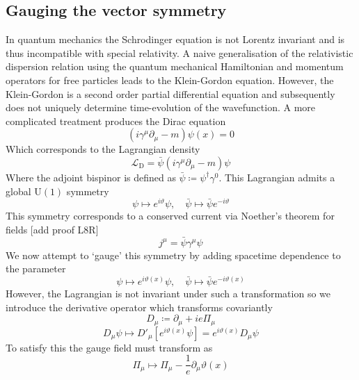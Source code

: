 \documentclass[11pt, a4paper]{article}
\theoremstyle{definition}
\theoremstyle{plain}
\begin{document}
\subsection{Gauging the vector symmetry}

In quantum mechanics the Schrodinger equation is not Lorentz invariant and is thus
incompatible with special relativity. A naive generalisation of the relativistic
dispersion relation using the quantum mechanical
Hamiltonian and momentum operators for free particles leads to the Klein-Gordon
equation. However, the Klein-Gordon is a second order partial differential equation and
subsequently does not uniquely determine time-evolution of the wavefunction.
A more complicated treatment produces the Dirac equation
\begin{equation}
  (i \gamma^\mu\partial_\mu - m)\psi(x) = 0
\end{equation}
Which corresponds to the Lagrangian density
\begin{equation}
  \mathcal{L}_\mathrm{D} = \bar{\psi}(i \gamma^\mu\partial_\mu - m)\psi
\end{equation}
Where the adjoint bispinor is defined as $\bar{\psi} \coloneq \psi^\dagger\gamma^0$.
This Lagrangian admits a global $\mathrm{U}(1)$ symmetry
\begin{equation}
  \psi \mapsto e^{i\vartheta}\psi, \quad \bar{\psi} \mapsto \bar{\psi}e^{-i\vartheta} 
\end{equation}
This symmetry corresponds to a conserved current via Noether's theorem for fields
[add proof L8R]
\begin{equation}
  j^\mu = \bar{\psi}\gamma^\mu\psi
\end{equation}
We now attempt to `gauge' this symmetry by adding spacetime dependence to the 
parameter
\begin{equation}
  \psi \mapsto e^{i\vartheta(x)}\psi, \quad \bar{\psi} \mapsto \bar{\psi}e^{-i\vartheta(x)}  
\end{equation}
However, the Lagrangian is not invariant under such a transformation so we introduce the
derivative operator which transforms covariantly
\begin{equation}
  D_\mu \coloneq \partial_\mu + ie\Pi_\mu
\end{equation}
\begin{equation}
  D_\mu \psi \mapsto D'_\mu\left[e^{i\vartheta(x)}\psi\right] = e^{i\vartheta(x)}D_\mu\psi
\end{equation}
To satisfy this the gauge field must transform as
\begin{equation}
  \Pi_\mu \mapsto \Pi_\mu -\frac{1}{e}\partial_\mu\vartheta(x)
\end{equation}
\end{document}
